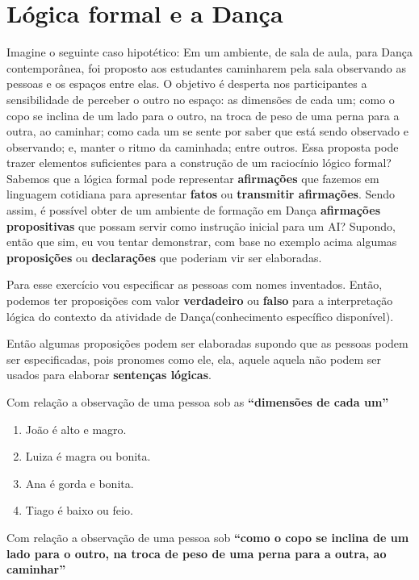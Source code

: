 ﻿
\section{Lógica formal e a Dança}

Imagine o seguinte caso hipotético:
Em um ambiente, de sala de aula, para Dança contemporânea, foi proposto aos estudantes caminharem pela sala observando as pessoas e os espaços entre elas. O objetivo é desperta nos participantes a sensibilidade de perceber o outro no espaço: as dimensões de cada um; como o copo se inclina de um lado para o outro, na troca de peso de uma perna para a outra, ao caminhar; como cada um se sente por saber que está sendo observado e observando; e, manter o ritmo da caminhada; entre outros. Essa proposta pode trazer elementos suficientes para a construção de um raciocínio lógico formal? Sabemos que a lógica formal pode representar \textbf{afirmações} que fazemos em linguagem cotidiana para apresentar \textbf{fatos} ou \textbf{transmitir afirmações}. Sendo assim, é possível obter de um ambiente de formação em Dança \textbf{afirmações propositivas} que possam servir como instrução inicial para um AI? Supondo, então que sim, eu vou tentar demonstrar, com base no exemplo acima algumas \textbf{proposições} ou \textbf{declarações} que poderiam vir ser elaboradas.

Para esse exercício vou especificar as pessoas com nomes inventados. Então, podemos ter proposições com valor \textbf{verdadeiro} ou \textbf{falso} para a interpretação lógica do contexto da atividade de Dança(conhecimento específico disponível).

Então algumas proposições podem ser elaboradas supondo que as pessoas podem ser especificadas, pois pronomes como ele, ela, aquele aquela não podem ser usados para elaborar \textbf{sentenças lógicas}.
 
Com relação a observação de uma pessoa sob as \textbf{``dimensões de cada um''}

\begin{enumerate}[label=\alph*)]
	\item João é alto e magro.
	\item Luiza é magra ou bonita.
	\item Ana é gorda e bonita.
	\item Tiago é baixo ou feio.
\end{enumerate}

Com relação a observação de uma pessoa sob \textbf{``como o copo se inclina de um lado para o outro, na troca de peso de uma perna para a outra, ao caminhar''}

